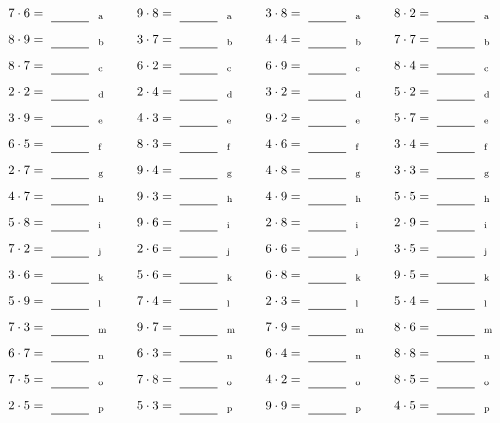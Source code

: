 \documentclass
[
  draft    = true,
  fontsize = 11pt,
  parskip  = half-
]
{scrartcl}
\begin{document}
\par\vfill\par
\begin{align*}
    \pline{7\cdot6}&=\rline{a}
  & \pline{9\cdot8}&=\rline{a}
  & \pline{3\cdot8}&=\rline{a}
  & \pline{8\cdot2}&=\rline{a} \\[1ex]
    \pline{8\cdot9}&=\rline{b}
  & \pline{3\cdot7}&=\rline{b}
  & \pline{4\cdot4}&=\rline{b}
  & \pline{7\cdot7}&=\rline{b} \\[1ex]
    \pline{8\cdot7}&=\rline{c}
  & \pline{6\cdot2}&=\rline{c}
  & \pline{6\cdot9}&=\rline{c}
  & \pline{8\cdot4}&=\rline{c} \\[1ex]
    \pline{2\cdot2}&=\rline{d}
  & \pline{2\cdot4}&=\rline{d}
  & \pline{3\cdot2}&=\rline{d}
  & \pline{5\cdot2}&=\rline{d} \\[1ex]
    \pline{3\cdot9}&=\rline{e}
  & \pline{4\cdot3}&=\rline{e}
  & \pline{9\cdot2}&=\rline{e}
  & \pline{5\cdot7}&=\rline{e} \\[1ex]
    \pline{6\cdot5}&=\rline{f}
  & \pline{8\cdot3}&=\rline{f}
  & \pline{4\cdot6}&=\rline{f}
  & \pline{3\cdot4}&=\rline{f} \\[1ex]
    \pline{2\cdot7}&=\rline{g}
  & \pline{9\cdot4}&=\rline{g}
  & \pline{4\cdot8}&=\rline{g}
  & \pline{3\cdot3}&=\rline{g} \\[1ex]
    \pline{4\cdot7}&=\rline{h}
  & \pline{9\cdot3}&=\rline{h}
  & \pline{4\cdot9}&=\rline{h}
  & \pline{5\cdot5}&=\rline{h} \\[1ex]
    \pline{5\cdot8}&=\rline{i}
  & \pline{9\cdot6}&=\rline{i}
  & \pline{2\cdot8}&=\rline{i}
  & \pline{2\cdot9}&=\rline{i} \\[1ex]
    \pline{7\cdot2}&=\rline{j}
  & \pline{2\cdot6}&=\rline{j}
  & \pline{6\cdot6}&=\rline{j}
  & \pline{3\cdot5}&=\rline{j} \\[1ex]
    \pline{3\cdot6}&=\rline{k}
  & \pline{5\cdot6}&=\rline{k}
  & \pline{6\cdot8}&=\rline{k}
  & \pline{9\cdot5}&=\rline{k} \\[1ex]
    \pline{5\cdot9}&=\rline{l}
  & \pline{7\cdot4}&=\rline{l}
  & \pline{2\cdot3}&=\rline{l}
  & \pline{5\cdot4}&=\rline{l} \\[1ex]
    \pline{7\cdot3}&=\rline{m}
  & \pline{9\cdot7}&=\rline{m}
  & \pline{7\cdot9}&=\rline{m}
  & \pline{8\cdot6}&=\rline{m} \\[1ex]
    \pline{6\cdot7}&=\rline{n}
  & \pline{6\cdot3}&=\rline{n}
  & \pline{6\cdot4}&=\rline{n}
  & \pline{8\cdot8}&=\rline{n} \\[1ex]
    \pline{7\cdot5}&=\rline{o}
  & \pline{7\cdot8}&=\rline{o}
  & \pline{4\cdot2}&=\rline{o}
  & \pline{8\cdot5}&=\rline{o} \\[1ex]
    \pline{2\cdot5}&=\rline{p}
  & \pline{5\cdot3}&=\rline{p}
  & \pline{9\cdot9}&=\rline{p}
  & \pline{4\cdot5}&=\rline{p}
\end{align*}
\end{document}
